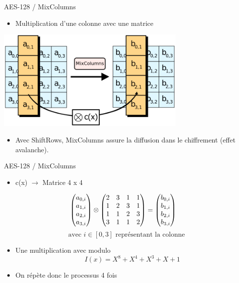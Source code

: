 \documentclass{beamer}
\begin{document}
\def\colonne#1{
 \begin{pmatrix}
  #1_{0,i} \\
  #1_{1,i} \\
  #1_{2,i} \\
  #1_{3,i}
  \end{pmatrix}
}

\begin{frame}{AES-128 / MixColumns}
\begin{itemize}
    \item Multiplication d'une colonne avec une matrice
\end{itemize}
\vspace{0.5 cm}
    \centering
    \includegraphics[width=0.7\textwidth]{images/AES-MixColumns.png}
    \begin{itemize}
    \item Avec ShiftRows, MixColumns assure la diffusion dans le chiffrement (effet avalanche).
\end{itemize}
\end{frame}

\begin{frame}{AES-128 / MixColumns}
\begin{itemize}
    \item c(x) $\longrightarrow$ Matrice 4 x 4
\end{itemize}
\vspace{0.5 cm}
    $$ \colonne{a} \otimes \MixColumn = \colonne{b} \quad $$
    \centering
   $$ \text{ avec } i \in [0,3] \text { représentant la colonne }$$
   \begin{itemize}
   \item Une multiplication avec modulo $$I(x) = X^8 + X^4 + X^3 + X + 1$$
    \item On répète donc le processus 4 fois
\end{itemize}
\end{frame}
\end{document}
